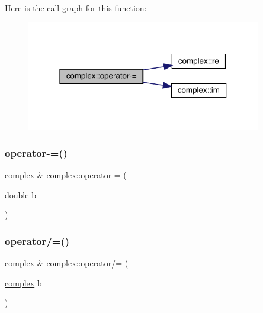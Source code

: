 Here is the call graph for this function\+:
\nopagebreak
\begin{figure}[H]
\begin{center}
\leavevmode
\includegraphics[width=291pt]{classcomplex_af797416b6b4b45c2bb54958fcd076a0e_cgraph}
\end{center}
\end{figure}
\mbox{\label{classcomplex_a91a1788c52422330b8785ac3dc87972f}} 
\subsubsection{\texorpdfstring{operator-\/=()}{operator-=()}\hspace{0.1cm}{\footnotesize\ttfamily [2/2]}}
{\footnotesize\ttfamily \mbox{\hyperlink{classcomplex}{complex}} \& complex\+::operator-\/= (\begin{DoxyParamCaption}\item[{double}]{b }\end{DoxyParamCaption})}

\mbox{\label{classcomplex_a2f33210a2ac9f91ad3f1f94958c52ee9}} 
\subsubsection{\texorpdfstring{operator/=()}{operator/=()}\hspace{0.1cm}{\footnotesize\ttfamily [1/2]}}
{\footnotesize\ttfamily \mbox{\hyperlink{classcomplex}{complex}} \& complex\+::operator/= (\begin{DoxyParamCaption}\item[{\mbox{\hyperlink{classcomplex}{complex}}}]{b }\end{DoxyParamCaption})}

